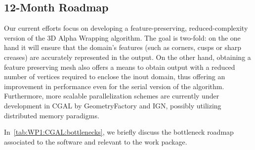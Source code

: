 \subsection{12-Month Roadmap}
\label{sec:WP1:CGAL:roadmap}



Our current efforts focus on developing a feature-preserving, reduced-complexity version of the 3D Alpha Wrapping algorithm.
The goal is two-fold: on the one hand it will ensure that the domain's features (such as corners, cusps or sharp creases) are accurately represented in the output. On the other hand, obtaining a feature preserving mesh also offers a means to obtain output with a reduced number of vertices required to enclose the inout domain, thus offering an improvement in performance even for the serial version of the algorithm. 
Furthermore, more scalable parallelization schemes are currently under development in CGAL by GeometryFactory and IGN,
possibly utilizing distributed memory paradigms. 


In~\cref{tab:WP1:CGAL:bottlenecks}, we briefly discuss the bottleneck roadmap associated to the software and relevant to the work package.

